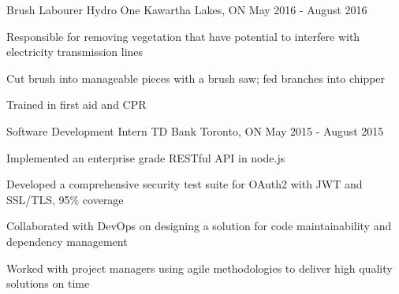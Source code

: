 

\begin{cventries}

  \cventry
    {Brush Labourer} %
    {Hydro One} %
    {Kawartha Lakes, ON} %
    {May 2016 - August 2016} %
    {
      \begin{cvitems} %
        \item {Responsible for removing vegetation that have potential to interfere with electricity transmission lines}
        \item {Cut brush into manageable pieces with a brush saw; fed branches into chipper}
        \item {Trained in first aid and CPR}
      \end{cvitems}
    }

  \cventry
    {Software Development Intern} %
    {TD Bank} %
    {Toronto, ON} %
    {May 2015 - August 2015} %
    {
      \begin{cvitems} %
        \item {Implemented an enterprise grade RESTful API in node.js}
        \item {Developed a comprehensive security test suite for OAuth2 with JWT and SSL/TLS, 95\% coverage}
        \item {Collaborated with DevOps on designing a solution for code maintainability and dependency management}
        \item {Worked with project managers using agile methodologies to deliver high quality solutions on time}
      \end{cvitems}
    }


\end{cventries}
